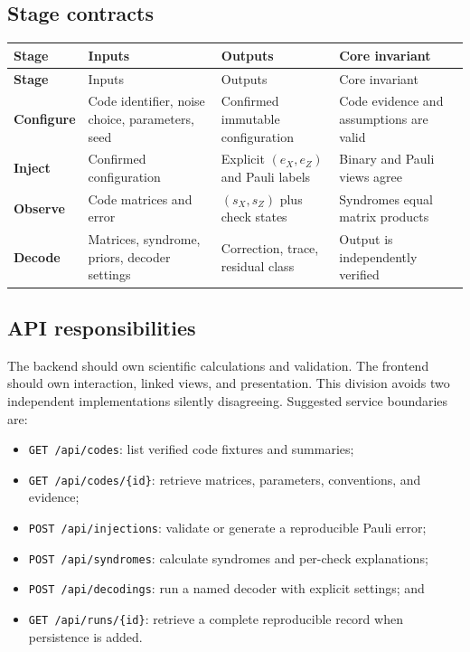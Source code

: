 \documentclass[11pt,letterpaper]{article}
\newcommand{\code}[1]{\texttt{#1}}
\begin{document}
\subsection{Stage contracts}

\begin{longtable}{@{}>{\bfseries}p{} p{} p{} p{}@{}}
\toprule
Stage & Inputs & Outputs & Core invariant \\
\midrule
\endfirsthead
\toprule
Stage & Inputs & Outputs & Core invariant \\
\midrule
\endhead
Configure & Code identifier, noise choice, parameters, seed & Confirmed immutable configuration & Code evidence and assumptions are valid \\
Inject & Confirmed configuration & Explicit $(e_X,e_Z)$ and Pauli labels & Binary and Pauli views agree \\
Observe & Code matrices and error & $(s_X,s_Z)$ plus check states & Syndromes equal matrix products \\
Decode & Matrices, syndrome, priors, decoder settings & Correction, trace, residual class & Output is independently verified \\
\bottomrule
\end{longtable}

\subsection{API responsibilities}

The backend should own scientific calculations and validation. The frontend should own interaction,
linked views, and presentation. This division avoids two independent implementations silently
disagreeing. Suggested service boundaries are:

\begin{itemize}
  \item \code{GET /api/codes}: list verified code fixtures and summaries;
  \item \code{GET /api/codes/\{id\}}: retrieve matrices, parameters, conventions, and evidence;
  \item \code{POST /api/injections}: validate or generate a reproducible Pauli error;
  \item \code{POST /api/syndromes}: calculate syndromes and per-check explanations;
  \item \code{POST /api/decodings}: run a named decoder with explicit settings; and
  \item \code{GET /api/runs/\{id\}}: retrieve a complete reproducible record when persistence is added.
\end{itemize}
\end{document}
